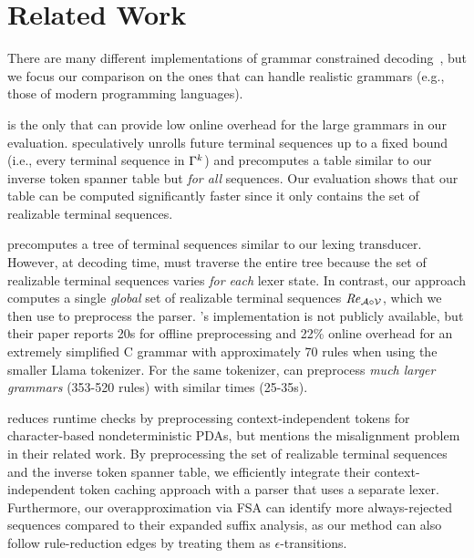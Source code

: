 \section{Related Work}
\label{sec:related}

There are many different implementations of grammar constrained decoding~\cite{geng2024grammarconstrained, willard2023efficient, guidance, beurer2024domino, ugare2024syncode, dong2024xgrammar, llamacpp}, but we focus our comparison on the ones that can handle realistic grammars (e.g., those of modern programming languages).

\syncode \cite{ugare2024syncode} is the only that can provide low online overhead for the large grammars in our evaluation. \syncode speculatively unrolls future terminal sequences up to a fixed bound (i.e., every terminal sequence in $\Gamma^k$) and precomputes a table similar to our inverse token spanner table but \textit{for all} sequences. Our evaluation shows that our table can be computed significantly faster since it only contains the set of realizable terminal sequences.

\domino \cite{beurer2024domino} precomputes a tree of terminal sequences similar to our lexing transducer. 
However, at decoding time, \domino must traverse the entire tree because the set of realizable terminal sequences varies \emph{for each} lexer state. 
In contrast, our approach computes a single \emph{global} set of realizable terminal sequences $\mathit{Re}_{\mathcal{A} \circ \mathcal{V}}$, which we then use to preprocess the parser.  
\domino's implementation is not publicly available, but their paper reports 20s for offline preprocessing and 22\% online overhead for an extremely simplified C grammar with approximately 70 rules when using the smaller Llama tokenizer. 
For the same tokenizer, \name can preprocess \textit{much larger grammars} (353-520 rules) with similar times (25-35s).



\xgrammar \cite{dong2024xgrammar} reduces runtime checks by preprocessing context-independent tokens for character-based nondeterministic PDAs, but mentions the misalignment problem in their related work. 
By preprocessing the set of realizable terminal sequences and the inverse token spanner table, 
we efficiently integrate their context-independent token caching approach with a parser that uses a separate lexer. Furthermore, our overapproximation via FSA can identify more always-rejected sequences compared to their expanded suffix analysis, as our method can also follow rule-reduction edges by treating them as $\epsilon$-transitions.




